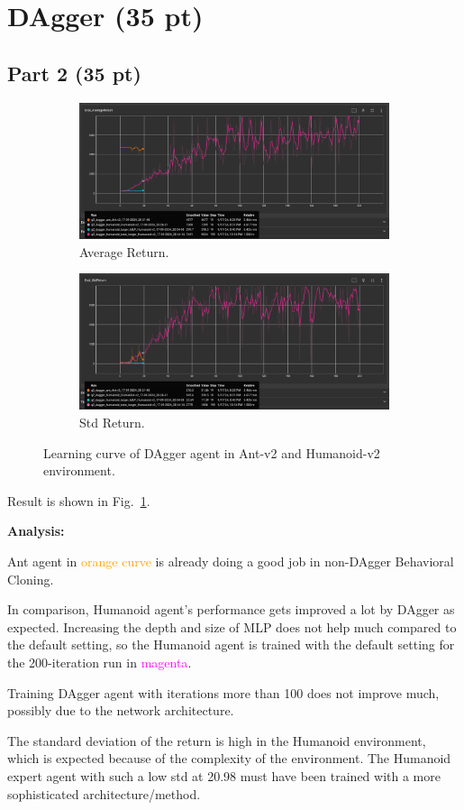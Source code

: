 \documentclass{article}
\newcommand{\fref}[1]{Fig.~\ref{#1}}
\begin{document}
\section{DAgger (35 pt)}
\subsection{Part 2 (35 pt)}
\begin{figure}[!h]
  \centering
  \begin{subfigure}[b]{.99\linewidth}
    \centering
    \includegraphics[width=\columnwidth]{figs/DAgger_average_return.png}
    \caption{Average Return.}
  \end{subfigure}
  \begin{subfigure}[b]{.99\linewidth}
    \centering
    \includegraphics[width=\columnwidth]{figs/DAgger_std_return.png}
    \caption{Std Return.}
  \end{subfigure}
  \caption{Learning curve of DAgger agent in Ant-v2 and Humanoid-v2 environment.}
  \label{fig:p5}
\end{figure}

Result is shown in \fref{fig:p5}.

\textbf{Analysis:}

Ant agent in \textcolor{orange}{orange curve} is already doing a good job in non-DAgger Behavioral Cloning.

In comparison, Humanoid agent's performance gets improved a lot by DAgger as expected.
Increasing the depth and size of MLP does not help much compared to the default setting, so the Humanoid agent is trained with the default setting for the 200-iteration run in \textcolor{magenta}{magenta}.

Training DAgger agent with iterations more than 100 does not improve much, possibly due to the network architecture.

The standard deviation of the return is high in the Humanoid environment, which is expected because of the complexity of the environment.
The Humanoid expert agent with such a low std at 20.98 must have been trained with a more sophisticated architecture/method.
\end{document}
